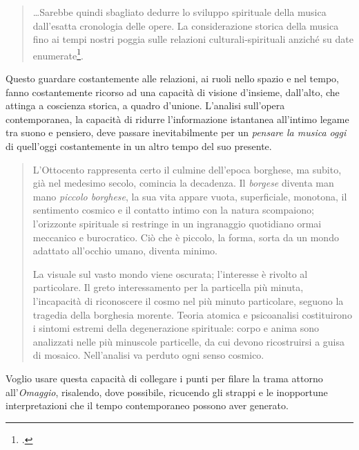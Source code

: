 \begin{quote}
\ldots Sarebbe quindi sbagliato dedurre lo sviluppo spirituale della musica dall'esatta cronologia delle opere. La considerazione storica della musica fino ai tempi nostri poggia sulle relazioni culturali-spirituali anziché su date enumerate\footcite[pag. 2 ]{fleischer:mcont}.
\end{quote}

Questo guardare costantemente alle relazioni, ai ruoli nello spazio e nel tempo, fanno costantemente ricorso ad una capacità di visione d'insieme, dall'alto, che attinga a coscienza storica, a quadro d'unione. L'analisi sull'opera contemporanea, la capacità di ridurre l'informazione istantanea all'intimo legame tra suono e pensiero, deve passare inevitabilmente per un \emph{pensare la musica oggi} di quell'oggi costantemente in un altro tempo del suo presente. 

\begin{quote}
L'Ottocento rappresenta certo il culmine dell'epoca borghese, ma subito, già nel medesimo secolo, comincia la decadenza. Il \emph{borgese} diventa man mano \emph{piccolo borghese}, la sua vita appare vuota, superficiale, monotona, il sentimento cosmico e il contatto intimo con la natura scompaiono; l'orizzonte spirituale si restringe in un ingranaggio quotidiano ormai meccanico e burocratico. Ciò che è piccolo, la forma, sorta da un mondo adattato all'occhio umano, diventa minimo. 

La visuale sul vasto mondo viene oscurata; l'interesse è rivolto al particolare. Il greto interessamento per la particella più minuta, l'incapacità di riconoscere il cosmo nel più minuto particolare, seguono la tragedia della borghesia morente. Teoria atomica e psicoanalisi costituirono i sintomi estremi della degenerazione spirituale: corpo e anima sono analizzati nelle più minuscole particelle, da cui devono ricostruirsi a guisa di mosaico. Nell'analisi va perduto ogni senso cosmico.
\end{quote}

Voglio usare questa capacità di collegare i punti per filare la trama attorno all'\emph{Omaggio}, risalendo, dove possibile, ricucendo gli strappi e le inopportune interpretazioni che il tempo contemporaneo possono aver generato.

